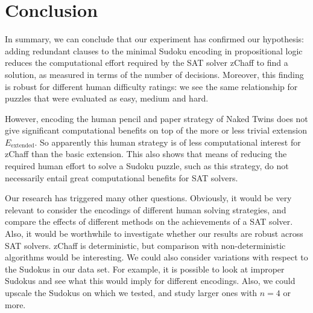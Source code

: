 \documentclass[10pt,a4paper,leqno]{article}
\begin{document}
\section*{Conclusion} 


In summary, we can conclude that our experiment has confirmed our hypothesis: adding redundant clauses to the minimal Sudoku encoding in propositional logic reduces the computational effort required by the SAT solver zChaff to find a solution, as measured in terms of the number of decisions. Moreover, this finding is robust for different human difficulty ratings: we see the same relationship for puzzles that were evaluated as easy, medium and hard. 

However, encoding the human pencil and paper strategy of Naked Twins does not give significant computational benefits on top of the more or less trivial extension $E_{\text{extended}}$. So apparently this human strategy is of less computational interest for zChaff than the basic extension. This also shows that means of reducing the required human effort to solve a Sudoku puzzle, such as this strategy, do not necessarily entail great computational benefits for SAT solvers. 

Our research has triggered many other questions. Obviously, it would be very relevant to consider the encodings of different human solving strategies, and compare the effects of different methods on the achievements of a SAT solver. Also, it would be worthwhile to investigate whether our results are robust across SAT solvers. zChaff is deterministic, but comparison with non-deterministic algorithms would be interesting. We could also consider variations with respect to the Sudokus in our data set. For example, it is possible to look at improper Sudokus and see what this would imply for different encodings. Also, we could upscale the Sudokus on which we tested, and study larger ones with $n=4$ or more. 
\end{document}
